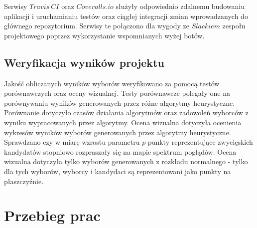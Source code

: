\documentclass[pdflatex,11pt]{../aghdoc_version2}
\newlength\tindent
\renewcommand{\indent}{\hspace*{\tindent}}
\begin{document}
\indent Serwisy $Travis \ CI$ oraz $Coveralls.io$ służyły odpowiednio zdalnemu budowaniu aplikacji i
uruchamianiu testów oraz ciągłej integracji zmian wprowadzanych do głównego
repozytorium. Serwisy te połączono dla wygody ze $Slackiem$ zespołu projektowego poprzez
wykorzystanie wspomnianych wyżej botów.

\section{Weryfikacja wyników projektu}
Jakość obliczanych wyników wyborów weryfikowano za pomocą testów
porównawczych oraz oceny wizualnej. Testy porównawcze polegały one na porównywaniu wyników generowanych przez różne
algorytmy heurystyczne. Porównanie dotyczyło czasów działania algorytmów oraz zadowoleń wyborców z wyniku wypracowanych przez algorytmy. Ocena wizualna dotyczyła ocenienia wykresów wyników wyborów generowanych przez algorytmy heurystyczne. Sprawdzano czy w miarę wzrostu parametru $p$ punkty reprezentujące zwycięskich kandydatów stopniowo rozpraszały się na mapie spektrum poglądów. Ocena wizualna dotyczyła tylko wyborów generowanych z rozkładu normalnego - tylko dla tych wyborów, wyborcy i kandydaci są reprezentowani jako punkty na płaszczyźnie.

\chapter{Przebieg prac}
\end{document}
